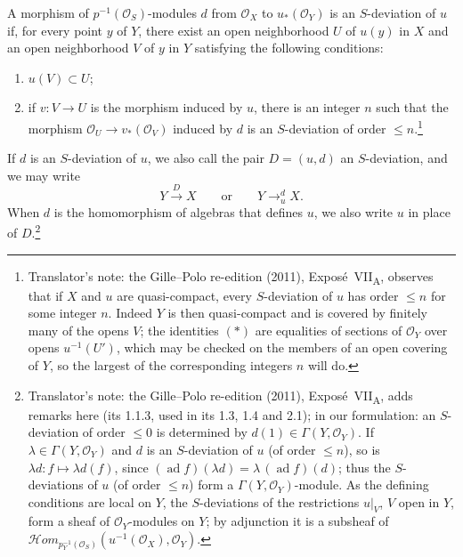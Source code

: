 A morphism of \(p^{-1}(\mathcal O_S)\)-modules \(d\) from
\(\mathcal O_X\) to \(u_*(\mathcal O_Y)\) is an \(S\)-deviation of
\(u\) if, for every point \(y\) of \(Y\), there exist an open
neighborhood \(U\) of \(u(y)\) in \(X\) and an open neighborhood \(V\)
of \(y\) in \(Y\) satisfying the following conditions:
\begin{enumerate}
\item[\textup{a)}] \(u(V)\subset U\);
\item[\textup{b)}] if \(v:V\to U\) is the morphism induced by \(u\),
there is an integer \(n\) such that the morphism
\(\mathcal O_U\to v_*(\mathcal O_V)\) induced by \(d\) is an
\(S\)-deviation of order \(\leq n\).\footnote{Translator's note: the Gille--Polo re-edition (2011),
Expos\'e~VII\textsubscript{A}, observes that if \(X\) and \(u\) are
quasi-compact, every \(S\)-deviation of \(u\) has order \(\leq n\) for
some integer \(n\). Indeed \(Y\) is then quasi-compact and is covered by
finitely many of the opens \(V\); the identities \((\ast)\) are
equalities of sections of \(\mathcal O_Y\) over opens \(u^{-1}(U')\),
which may be checked on the members of an open covering of \(Y\), so the
largest of the corresponding integers \(n\) will do.}
\end{enumerate}

If \(d\) is an \(S\)-deviation of \(u\), we also call the pair
\(D=(u,d)\) an \(S\)-deviation, and we may write
\[
  Y\xrightarrow{D}X
  \qquad\text{or}\qquad
  Y\mathop{\longrightarrow}^{d}_{u}X.
\]
When \(d\) is the homomorphism of algebras that defines \(u\), we also
write \(u\) in place of \(D\).\footnote{Translator's note: the
Gille--Polo re-edition (2011), Expos\'e~VII\textsubscript{A}, adds
remarks here (its 1.1.3, used in its 1.3, 1.4 and 2.1); in our
formulation: an \(S\)-deviation of order \(\leq0\) is determined by
\(d(1)\in\Gamma(Y,\mathcal O_Y)\). If \(\lambda\in\Gamma(Y,\mathcal O_Y)\)
and \(d\) is an \(S\)-deviation of \(u\) (of order \(\leq n\)), so is
\(\lambda d:f\mapsto\lambda d(f)\), since
\((\operatorname{ad}f)(\lambda d)=\lambda\,(\operatorname{ad}f)(d)\);
thus the \(S\)-deviations of \(u\) (of order \(\leq n\)) form a
\(\Gamma(Y,\mathcal O_Y)\)-module. As the defining conditions are local
on \(Y\), the \(S\)-deviations of the restrictions \(u|_V\), \(V\) open
in \(Y\), form a sheaf of \(\mathcal O_Y\)-modules on \(Y\); by
adjunction it is a subsheaf of
\(\mathcal Hom_{p_Y^{-1}(\mathcal O_S)}(u^{-1}(\mathcal O_X),\mathcal O_Y)\).}

